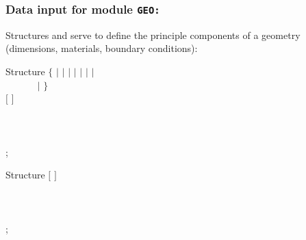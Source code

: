 \vskip 0.2cm

\subsubsection{Data input for module {\tt GEO:}}\label{sect:geo_data1}

Structures  and  serve to define the
principle components of a geometry (dimensions, materials, boundary
conditions):

\begin{DataStructure}{Structure }
$\{$  $|$   $|$   $|$ 
  $|$    $|$    $|$     $|$ \\
~~~~~~   $|$    $\}$ \\
$[$   $]$ \\
 \\
 \\
 \\
;
\end{DataStructure}

\begin{DataStructure}{Structure }
$[$   $]$ \\
 \\
 \\
 \\
;
\end{DataStructure}

\noindent

